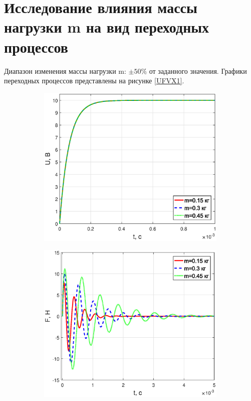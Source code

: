 \documentclass[12pt,a4paper]{article}
\begin{document}
\newpage
\section{Исследование влияния массы нагрузки m на вид переходных процессов}
Диапазон изменения массы нагрузки m: $\pm 50\%$  от заданного значения. Графики переходных процессов представлены на рисунке \ref{UFVX1}.
\begin{figure}[H]
	\centering
	\begin{subfigure}[b]{0.48\textwidth}
	    \includegraphics[width = \textwidth]{U1}
	\end{subfigure}
	\hfill
	\begin{subfigure}[b]{0.48\textwidth}
		\includegraphics[width = \textwidth]{F1}

\end{subfigure}
\end{figure}
\end{document}

